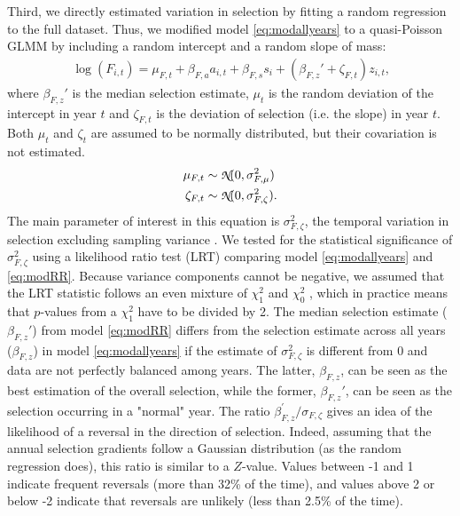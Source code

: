 Third, we directly estimated variation in selection by fitting a random regression to the full dataset. Thus, we modified model \ref{eq:modallyears} to a quasi-Poisson GLMM by including a random intercept and a random slope of mass:
\begin{align}
\log(F_{i,t}) = \mu_{F,t} + \beta_{F,a} a_{i,t} + \beta_{F,s} s_{i} + (\beta_{F,z}' + \zeta_{F,t})z_{i,t} \text{,}
\label{eq:modRR}
\end{align}
where $\beta_{F,z}'$ is the median selection estimate, $\mu_t$ is the random deviation of the intercept in year $t$ and $\zeta_{F,t}$ is the deviation of selection (i.e. the slope) in year $t$. Both $\mu_t$ and $\zeta_t$ are assumed to be normally distributed, but their covariation is not estimated. 
\begin{align}
\mu_{F,t} & \sim\text{{\fontfamily{pzc}\selectfont N}}(0,\sigma_{F,\mu}^2)\\
\zeta_{F,t} &\sim \text{{\fontfamily{pzc}\selectfont N}}(0,\sigma_{F,\zeta}^2)\text{.}
\end{align}
The main parameter of interest in this equation is $\sigma_{F,\zeta}^2$, the temporal variation in selection excluding sampling variance \parencite{Chevin2015b}. We tested for the statistical significance of  $\sigma_{F,\zeta}^2$ using a likelihood ratio test (LRT) \parencite[see e.g.][]{Pinheiro2000,Crainiceanu2004} comparing model \ref{eq:modallyears} and
\ref{eq:modRR}. Because variance components cannot be negative, we assumed that the LRT statistic follows an even mixture of $\chi_{1}^2$ and $\chi_{0}^2$ \parencite{Self1987}, which in practice means that $p$-values from a $\chi_{1}^2$ have to be divided by 2.
The median selection estimate ($\beta_{F,z}'$) from model \ref{eq:modRR} differs from the selection estimate across all years ($\beta_{F,z}$) in model \ref{eq:modallyears} if the estimate of $\sigma_{F,\zeta}^2$ is different from 0 and data are not perfectly balanced among years. The latter, $\beta_{F,z}$, can be seen as the best estimation of the overall selection, while the former, $\beta_{F,z}'$, can be seen as the selection occurring in a "normal" year. The ratio $\beta_{F,z}^\prime/\sigma_{F,\zeta} $ gives an idea of the likelihood of a reversal in the direction of selection. Indeed, assuming that the annual selection gradients follow a Gaussian distribution (as the random regression does), this ratio is similar to a $Z$-value. Values between -1 and 1 indicate frequent reversals (more than 32\% of the time), and values above 2 or below -2 indicate that reversals are unlikely (less than 2.5\% of the time). 

